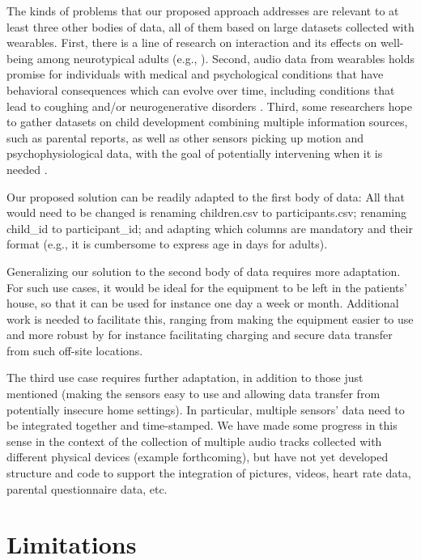 \documentclass[smallextended]{svjour3}       %
\begin{document}
The kinds of problems that our proposed approach addresses are relevant to at least three other bodies of data, all of them based on large datasets collected with wearables. First, there is a line of research on interaction and its effects on well-being among neurotypical adults (e.g., \cite{ear1}). Second, audio data from wearables holds promise for individuals with medical and psychological conditions that have behavioral consequences which can evolve over time, including conditions that lead to coughing \citep{Wu2018} and/or neurogenerative disorders \citep{riad2020vocal}. Third, some researchers hope to gather datasets on child development combining multiple information sources, such as parental reports, as well as other sensors picking up motion and psychophysiological data, with the goal of potentially intervening when it is needed \citep{levin2021sensing}.

Our proposed solution can be readily adapted to the first body of data: All that would need to be changed is renaming children.csv to participants.csv; renaming child\_id to participant\_id; and adapting which columns are mandatory and their format (e.g., it is cumbersome to express age in days for adults).

Generalizing our solution to the second body of data requires more adaptation. For such use cases, it would be ideal for the equipment to be left in the patients' house, so that it can be used for instance one day a week or month. Additional work is needed to facilitate this, ranging from making the equipment easier to use and more robust by for instance facilitating charging and secure data transfer from such off-site locations.

The third use case requires further adaptation, in addition to those just mentioned (making the sensors easy to use and allowing data transfer from potentially insecure home settings). In particular, multiple sensors' data need to be integrated together and time-stamped. We have made some progress in this sense in the context of the collection of multiple audio tracks collected with different physical devices (example forthcoming), but have not yet developed structure and code to support the integration of pictures, videos, heart rate data, parental questionnaire data, etc. 

\section{Limitations}
\end{document}
